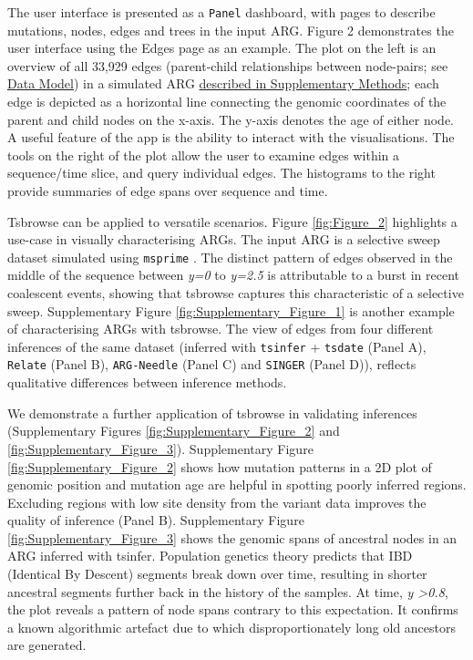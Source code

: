 \documentclass[unnumsec,webpdf,contemporary,large,namedate]{oup-authoring-template}%
\begin{document}
The user interface is presented as a \texttt{Panel} dashboard, with pages to
describe mutations, nodes, edges and trees in the input ARG. Figure 2
demonstrates the user interface using the Edges page as an example. The plot on
the left is an overview of all 33,929 edges (parent-child relationships between
node-pairs; see \hyperref[subsec:Data_Model]{Data Model}) in a simulated ARG
\hyperref[subsec:sweep_simulation]{described in Supplementary Methods}; each
edge is depicted as a horizontal line connecting the genomic coordinates of the
parent and child nodes on the x-axis. The y-axis denotes the age of either
node. A useful feature of the app is the ability to interact with the
visualisations. The tools on the right of the plot allow the user to examine
edges within a sequence/time slice, and query individual edges. The histograms
to the right provide summaries of edge spans over sequence and time.


 Tsbrowse can be applied to versatile scenarios. Figure \ref{fig:Figure_2}
highlights a use-case in visually characterising ARGs. The input ARG is a
selective sweep dataset simulated using \texttt{msprime}
\citep{Baumdicker2021}. The distinct pattern of edges observed in the middle of
the sequence between \textit{y=0} to \textit{y=2.5} is attributable to a burst
in recent coalescent events, showing that tsbrowse captures this characteristic
of a selective sweep. Supplementary Figure \ref{fig:Supplementary_Figure_1} is
another example of characterising ARGs with tsbrowse. The view of edges from
four different inferences of the same dataset (inferred with \texttt{tsinfer} +
\texttt{tsdate} (Panel A), \texttt{Relate} (Panel B), \texttt{ARG-Needle}
(Panel C) and \texttt{SINGER} (Panel D)), reflects qualitative differences
between inference methods. 

We demonstrate a further application of tsbrowse in validating inferences
(Supplementary Figures \ref{fig:Supplementary_Figure_2} and
\ref{fig:Supplementary_Figure_3}). Supplementary Figure
\ref{fig:Supplementary_Figure_2} shows how mutation patterns in a 2D plot of
genomic position and mutation age are helpful in spotting poorly inferred
regions. Excluding regions with low site density from the variant data improves
the quality of inference (Panel B). Supplementary Figure
\ref{fig:Supplementary_Figure_3} shows the genomic spans of ancestral nodes in
an ARG inferred with tsinfer. Population genetics theory predicts that IBD
(Identical By Descent) segments break down over time, resulting in shorter
ancestral segments further back in the history of the samples. At time,
\textit{y \textgreater{0.8}}, the plot reveals a pattern of node spans contrary
to this expectation. It confirms a known algorithmic artefact due to which
disproportionately long old ancestors are generated.
\end{document}
